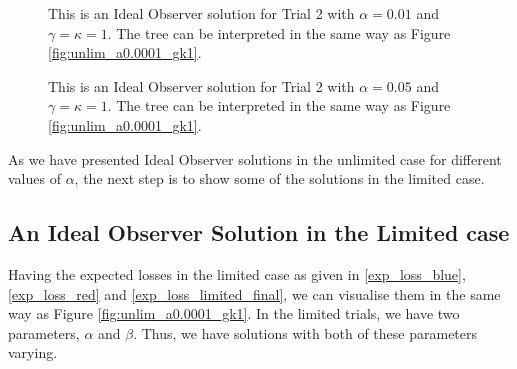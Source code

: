 \begin{figure}
    \centering
    \begin{minipage}{0.45\textwidth}
        \centering
        \scalebox{0.5}{}
        \caption[IO Solution for Trial 2. $\alpha=0.01$,$\gamma=\kappa=1$]{This is an Ideal Observer solution for Trial 2 with $\alpha=0.01$ and $\gamma=\kappa=1$. The tree can be interpreted in the same way as Figure \ref{fig:unlim_a0.0001_gk1}.}
        \label{fig:IO_trial2_a0.01}
    \end{minipage}\hfill
    \begin{minipage}{0.45\textwidth}
        \centering
        \scalebox{0.5}{}
        \caption[IO Solution for Trial 2. $\alpha=0.05$,$\gamma=\kappa=1$]{This is an Ideal Observer solution for Trial 2 with $\alpha=0.05$ and $\gamma=\kappa=1$. The tree can be interpreted in the same way as Figure \ref{fig:unlim_a0.0001_gk1}.}
        \label{fig:IO_trial2_a0.05}
    \end{minipage}
\end{figure}

As we have presented Ideal Observer solutions in the unlimited case for different values of $\alpha$, the next step is to show some of the solutions in the limited case. 




\subsection{An Ideal Observer Solution in the Limited case}
Having the expected losses in the limited case as given in \eqref{exp_loss_blue}, \eqref{exp_loss_red} and \eqref{exp_loss_limited_final}, we can visualise them in the same way as Figure \ref{fig:unlim_a0.0001_gk1}. In the limited trials, we have two parameters, $\alpha$ and $\beta$. Thus, we have solutions with both of these parameters varying. 

